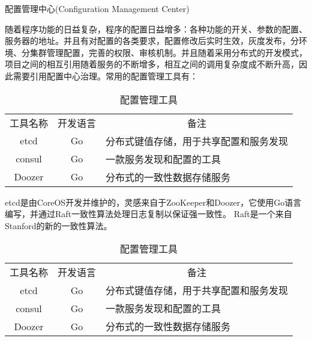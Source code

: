 \documentclass[8pt]{book}
\makeatletter
\numberwithin{dummy}{section}
\theoremstyle{ocrenumbox}
\theoremstyle{blacknumex}
\theoremstyle{blacknumbox}
\theoremstyle{ocrenum}
\renewcommand{\section}{\@startsection{section}{1}{\z@}
	{-4ex \@plus -1ex \@minus -.4ex}
	{1ex \@plus.2ex }
	{\normalfont\large\sffamily\bfseries}}
\makeatother
\begin{document}
\section{配置管理中心(Configuration Management Center)}

随着程序功能的日益复杂，程序的配置日益增多：各种功能的开关、参数的配置、服务器的地址。并且有对配置的各类要求，配置修改后实时生效，灰度发布，分环境、分集群管理配置，完善的权限、审核机制。并且随着采用分布式的开发模式，项目之间的相互引用随着服务的不断增多，相互之间的调用复杂度成不断升高，因此需要引用配置中心治理。常用的配置管理工具有：

\begin{table}[htbp]
	\caption{配置管理工具}
	\label{table:configmanagementtool}
	\begin{center}
		\begin{tabular}{|c|c|p{8cm}|}
			\hline
			\multirow{1}{*}{工具名称}
			& \multicolumn{1}{c|}{开发语言} 
			& \multicolumn{1}{c|}{备注}\\			
			\cline{1-3}
			etcd &  Go  & 分布式键值存储，用于共享配置和服务发现 \\
			\hline
			consul & Go &  一款服务发现和配置的工具 \\
			\hline
			Doozer & Go & 分布式的一致性数据存储服务 \\
			\hline							
		\end{tabular}	
	\end{center}
\end{table}

etcd是由CoreOS开发并维护的，灵感来自于ZooKeeper和Doozer，它使用Go语言编写，并通过Raft一致性算法处理日志复制以保证强一致性。 Raft是一个来自Stanford的新的一致性算法。


\begin{table}[htbp]
	\caption{配置管理工具}
	\label{table:configmanagementtool}
	\begin{center}
		\begin{tabular}{|c|c|p{8cm}|}
			\hline
			\multirow{1}{*}{工具名称}
			& \multicolumn{1}{c|}{开发语言} 
			& \multicolumn{1}{c|}{备注}\\			
			\cline{1-3}
			etcd &  Go  & 分布式键值存储，用于共享配置和服务发现 \\
			\hline
			consul & Go &  一款服务发现和配置的工具 \\
			\hline
			Doozer & Go & 分布式的一致性数据存储服务 \\
			\hline							
		\end{tabular}	
	\end{center}
\end{table}
\end{document}
